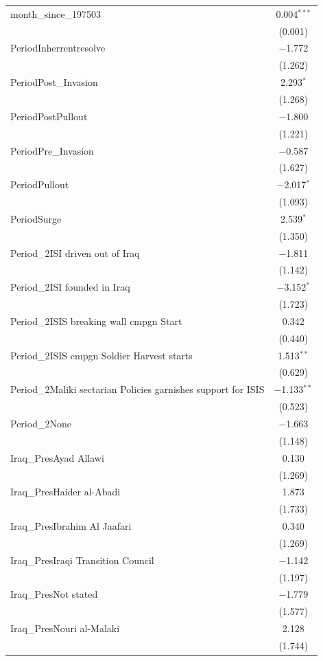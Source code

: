 \begin{table}[ht]
\begin{adjustbox}{width=1\textwidth}
\begin{tabular}{@{\extracolsep{5pt}}lc}
 month\_since\_197503 & 0.004$^{***}$ \\ 
  & (0.001) \\ 
 PeriodInherrentresolve & $-$1.772 \\ 
  & (1.262) \\ 
 PeriodPost\_Invasion & 2.293$^{*}$ \\ 
  & (1.268) \\ 
 PeriodPostPullout & $-$1.800 \\ 
  & (1.221) \\ 
 PeriodPre\_Invasion & $-$0.587 \\ 
  & (1.627) \\ 
 PeriodPullout & $-$2.017$^{*}$ \\ 
  & (1.093) \\
 PeriodSurge & 2.539$^{*}$ \\ 
  & (1.350) \\
 Period\_2ISI driven out of Iraq & $-$1.811 \\ 
  & (1.142) \\
 Period\_2ISI founded in Iraq & $-$3.152$^{*}$ \\ 
  & (1.723) \\
 Period\_2ISIS breaking wall cmpgn Start & 0.342 \\ 
  & (0.440) \\
 Period\_2ISIS cmpgn Soldier Harvest starts & 1.513$^{**}$ \\ 
  & (0.629) \\
 Period\_2Maliki sectarian Policies garnishes support for ISIS & $-$1.133$^{**}$ \\ 
  & (0.523) \\
 Period\_2None & $-$1.663 \\ 
  & (1.148) \\
 Iraq\_PresAyad Allawi & 0.130 \\ 
  & (1.269) \\
 Iraq\_PresHaider al-Abadi & 1.873 \\ 
  & (1.733) \\
 Iraq\_PresIbrahim Al Jaafari & 0.340 \\ 
  & (1.269) \\
 Iraq\_PresIraqi Transition Council & $-$1.142 \\ 
  & (1.197) \\
 Iraq\_PresNot stated & $-$1.779 \\ 
  & (1.577) \\
 Iraq\_PresNouri al-Malaki & 2.128 \\ 
  & (1.744) \\

\end{tabular}
\end{adjustbox}
\end{table}
